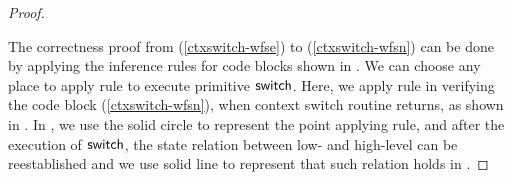 \begin{proof}
    \begin{center}
        
        \vspace*{-0.5em}
        \label{fig:refinement reasoning}
    \end{center}

    The correctness proof from
    (\ref{ctxswitch-wfse}) to (\ref{ctxswitch-wfsn})
    can be done by applying the inference rules for
    code blocks shown in
    \Fig{\ref{fig:Selected Inference Rules for Refinement Verification}}.
    We can choose any place to apply
     rule to execute primitive $\mathsf{switch}$.
    Here, we apply  rule
    in verifying the code block
    \SwitchNewTask{} (\ref{ctxswitch-wfsn}),
    when context switch routine returns,
    as shown in \Fig{\ref{fig:refinement reasoning}}.
    In \Fig{\ref{fig:refinement reasoning}}, we use the
    solid circle to represent the point applying  rule,
    and after the execution of $\mathsf{switch}$, the
    state relation between low- and high-level can
    be reestablished and we use solid line to represent
    that such relation holds in \Fig{\ref{fig:refinement reasoning}}.
\end{proof}

